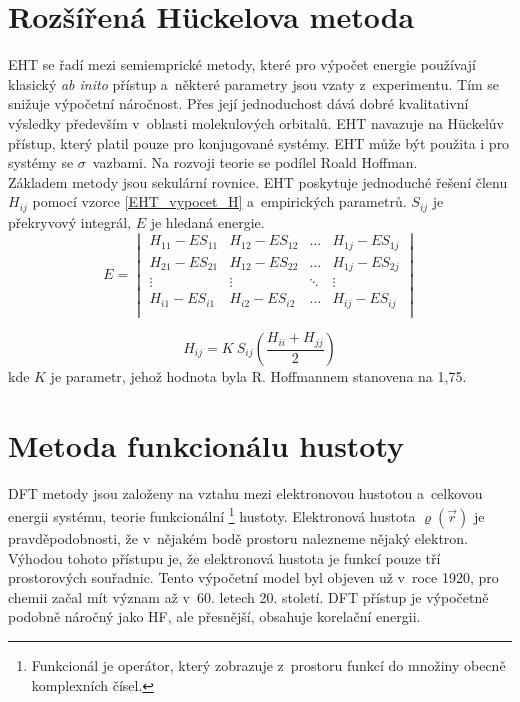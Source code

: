 \documentclass[
  printed, %
  table,   %
  lof,     %
  lot,     %
  oneside,
]{fithesis3}
\begin{document}
\section{Rozšířená Hückelova metoda}
EHT se řadí mezi semiemprické metody, které  pro výpočet energie používají klasický \textit{ab inito} přístup a~některé parametry jsou vzaty z~experimentu. Tím se snižuje výpočetní náročnost. Přes její jednoduchost dává dobré kvalitativní výsledky především v~oblasti molekulových orbitalů. EHT navazuje na Hückelův přístup, který platil pouze pro konjugované systémy. EHT může být použita i pro systémy se $\sigma$~vazbami. Na rozvoji teorie se podílel Roald Hoffman.\cite{lowe2011quantum} \\
Základem metody jsou sekulární rovnice. EHT poskytuje jednoduché řešení členu $H_{ij}$ pomocí vzorce \ref{EHT_vypocet_H} a~empirických parametrů. $S_{ij}$ je překryvový integrál, $E$ je hledaná energie.
\begin{equation}
E = \begin{vmatrix}
H_{11} - E S_{11} & H_{12} - E S_{12} & \dots & H_{1j} - E S_{1j} \\
H_{21} - E S_{21} & H_{12} - E S_{22} & \dots & H_{1j} - E S_{2j} \\
\vdots & \vdots &  \ddots & \vdots  \\
H_{i1} - E S_{i1} & H_{i2} - E S_{i2} & \dots & H_{ij} - E S_{ij} \\
\end{vmatrix}
\end{equation}


\begin{equation}
H_{ij} = K~S_{ij} \left( \frac{H_{ii} + H_{jj}}{2} \right)
\label{EHT_vypocet_H}
\end{equation}
kde $K$ je parametr, jehož hodnota byla R. Hoffmannem stanovena na 1,75.\cite{lowe2011quantum}

\section{Metoda funkcionálu hustoty}
DFT metody jsou založeny na vztahu mezi elektronovou hustotou a~celkovou energii systému, teorie funkcionální \footnote{Funkcionál je operátor, který zobrazuje z~prostoru funkcí do množiny obecně komplexních čísel.} hustoty. Elektronová hustota $\varrho(\vec{r})$ je pravděpodobnosti, že v~nějakém bodě prostoru nalezneme nějaký elektron.  Výhodou tohoto přístupu je, že elektronová hustota je funkcí pouze tří prostorových souřadnic. Tento výpočetní model byl objeven už v~roce 1920, pro chemii začal mít význam až v~60. letech 20. století. DFT přístup je výpočetně podobně náročný jako HF, ale přesnější, obsahuje korelační energii. \\
\end{document}
